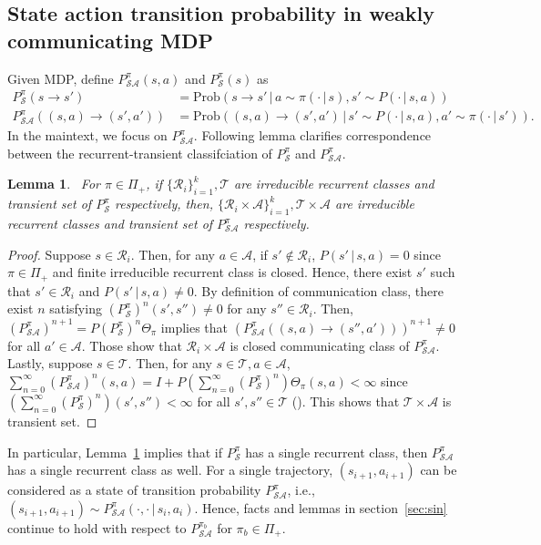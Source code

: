 \documentclass{article}
\newtheorem{lemma}[theorem]{Lemma}
\theoremstyle{definition}
\theoremstyle{remark}
\newcommand{\cA}{\mathcal{A}}
\newcommand{\cS}{\mathcal{S}}
\newcommand{\cR}{\mathcal{R}}
\newcommand{\cT}{\mathcal{T}}
\begin{document}
\subsection{State action transition probability in weakly communicating MDP }\label{ap:sa}
Given MDP, define $P_{\scriptscriptstyle \cS \cA}^\pi(s,a)$ and  $P^\pi_{\scriptscriptstyle\cS}(s)$ as
\begin{align*}
    P^{\pi}_{\scriptscriptstyle \cS }(s\rightarrow s')&=
\mathrm{Prob}(s\rightarrow s'\,|\,
a \sim \pi(\cdot\,|\,s), s'\sim P(\cdot\,|\,s,a))
\\
P^{\pi}_{\scriptscriptstyle \cS \cA}((s,a)\rightarrow (s',a'))&=
\mathrm{Prob}((s,a)\rightarrow (s',a')\,|\,
s'\sim P(\cdot\,|\,s,a),a' \sim \pi(\cdot\,|\,s')).
\end{align*}
In the maintext, we focus on $P_{\scriptscriptstyle \cS \cA}^\pi$. Following lemma clarifies correspondence between the recurrent-transient classifciation of $P^{\pi}_{\scriptscriptstyle \cS }$ and $P_{\scriptscriptstyle \cS \cA}^\pi$.
\begin{lemma}~\label{lem:inv}
    For $\pi \in \Pi_+$, if $ \{\cR_i\}^k_{i=1}, \cT $ are irreducible recurrent classes and transient set of     $P^{\pi}_{\scriptscriptstyle \cS}$ respectively, then,  $ \{\cR_i \times \cA\}^k_{i=1}, \cT\times \cA $ are irreducible recurrent classes and transient set of     $P^{\pi}_{\scriptscriptstyle \cS\cA}$  respectively.
\end{lemma}
\begin{proof}
    Suppose $s \in \cR_i$. Then, for any $a \in \cA$, if $s' \not\in \cR_i$, $P(s' \,|\,s,a ) = 0$ since $\pi \in \Pi_+$ and finite irreducible recurrent class is closed. Hence, there exist $s'$ such that $s'\in \cR_i$ and $P(s' \,|\,s,a ) \neq 0$. By definition of communication class, there exist $n$ satisfying $(P^{\pi}_{\scriptscriptstyle \cS})^{n}(s',s'') \neq 0 $ for any $s''\in \cR_i$. Then, $(P^{\pi}_{\scriptscriptstyle \cS \cA})^{n+1} = P(P^{\pi}_{\scriptscriptstyle \cS})^{n}\Theta_\pi $ implies that $(P^{\pi}_{\scriptscriptstyle \cS \cA}((s,a)\rightarrow (s'',a')))^{n+1} \neq 0$ for all $a' \in \cA$. Those show that $\cR_i \times \cA$ is closed communicating class of     $P^{\pi}_{\scriptscriptstyle \cS\cA}$. Lastly, suppose $s \in \cT$. Then, for any $ s\in \cT, a \in \cA$, $\sum^\infty_{n=0}(P^{\pi}_{\scriptscriptstyle \cS \cA})^{n}(s,a) = I+P(\sum^\infty_{n=0} (P^{\pi}_{\scriptscriptstyle \cS})^{n})\Theta_\pi(s,a) <\infty $  since $(\sum^\infty_{n=0} (P^{\pi}_{\scriptscriptstyle \cS})^{n})(s',s'') <\infty$ for all $s',s'' \in \cT$ (\citep[Lemma 8.3.20]{berman1994nonnegative}). This shows that $\cT\times \cA$ is transient set.
\end{proof}
In particular, Lemma~\ref{lem:inv} implies that  if $P^\pi_{\cS}$ has a single recurrent class, then  $P^\pi_{\cS \cA}$ has a single recurrent class as well. For a single trajectory, $(s_{i+1},a_{i+1})$ can be considered as a state of transition probability $P^\pi_{\cS \cA}$, i.e., $(s_{i+1},a_{i+1}) \sim P^\pi_{\cS \cA} ( \cdot, \cdot \,|\, s_{i},a_{i})$. Hence, facts and lemmas in section~\ref{sec:sin} continue to hold with respect to $P^{\pi_b}_{\cS \cA}$ for $\pi_b \in \Pi_+$.
\end{document}
